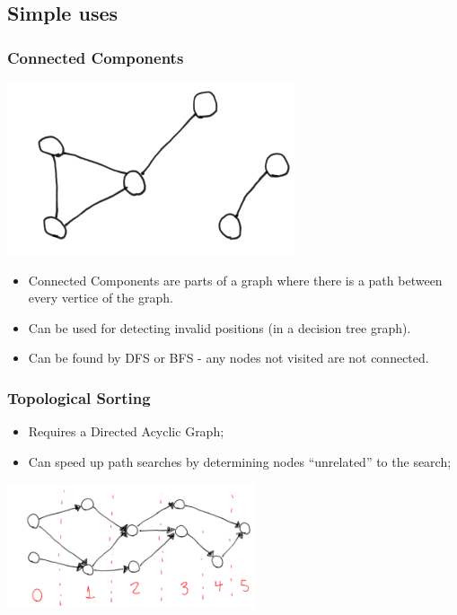 \documentclass{beamer}
\begin{document}
\subsection{Simple uses}
\begin{frame}
  \frametitle{Connected Components}
  \begin{center}
    \includegraphics[height=0.35\textheight]{connected}
  \end{center}
  \begin{block}{}
    \begin{itemize}
    \item Connected Components are parts of a graph where there is a
      path between every vertice of the graph.
    \item Can be used for detecting invalid positions (in a decision
      tree graph).
    \item Can be found by DFS or BFS - any nodes not visited are not
      connected.
    \end{itemize}
  \end{block}
\end{frame}


\begin{frame}
  \frametitle{Topological Sorting}
  \begin{block}{}
    \begin{itemize}
    \item Requires a Directed Acyclic Graph;
    \item Can speed up path searches by determining nodes
      ``unrelated'' to the search;
    \end{itemize}
  \end{block}
  \begin{center}
    \includegraphics[width=0.55\textwidth]{topological2}
  \end{center}
\end{frame}
\end{document}
